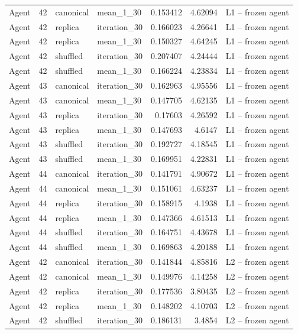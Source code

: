\begin{table}[htbp!]
\begin{tabular}{lrllrrl}
Agent & 42 & canonical & mean\_1\_30 & 0.153412 & 4.62094 & L1 -- frozen agent \\
Agent & 42 & replica & iteration\_30 & 0.166023 & 4.26641 & L1 -- frozen agent \\
Agent & 42 & replica & mean\_1\_30 & 0.150327 & 4.64245 & L1 -- frozen agent \\
Agent & 42 & shuffled & iteration\_30 & 0.207407 & 4.24444 & L1 -- frozen agent \\
Agent & 42 & shuffled & mean\_1\_30 & 0.166224 & 4.23834 & L1 -- frozen agent \\
Agent & 43 & canonical & iteration\_30 & 0.162963 & 4.95556 & L1 -- frozen agent \\
Agent & 43 & canonical & mean\_1\_30 & 0.147705 & 4.62135 & L1 -- frozen agent \\
Agent & 43 & replica & iteration\_30 & 0.17603 & 4.26592 & L1 -- frozen agent \\
Agent & 43 & replica & mean\_1\_30 & 0.147693 & 4.6147 & L1 -- frozen agent \\
Agent & 43 & shuffled & iteration\_30 & 0.192727 & 4.18545 & L1 -- frozen agent \\
Agent & 43 & shuffled & mean\_1\_30 & 0.169951 & 4.22831 & L1 -- frozen agent \\
Agent & 44 & canonical & iteration\_30 & 0.141791 & 4.90672 & L1 -- frozen agent \\
Agent & 44 & canonical & mean\_1\_30 & 0.151061 & 4.63237 & L1 -- frozen agent \\
Agent & 44 & replica & iteration\_30 & 0.158915 & 4.1938 & L1 -- frozen agent \\
Agent & 44 & replica & mean\_1\_30 & 0.147366 & 4.61513 & L1 -- frozen agent \\
Agent & 44 & shuffled & iteration\_30 & 0.164751 & 4.43678 & L1 -- frozen agent \\
Agent & 44 & shuffled & mean\_1\_30 & 0.169863 & 4.20188 & L1 -- frozen agent \\
Agent & 42 & canonical & iteration\_30 & 0.141844 & 4.85816 & L2 -- frozen agent \\
Agent & 42 & canonical & mean\_1\_30 & 0.149976 & 4.14258 & L2 -- frozen agent \\
Agent & 42 & replica & iteration\_30 & 0.177536 & 3.80435 & L2 -- frozen agent \\
Agent & 42 & replica & mean\_1\_30 & 0.148202 & 4.10703 & L2 -- frozen agent \\
Agent & 42 & shuffled & iteration\_30 & 0.186131 & 3.4854 & L2 -- frozen agent \\

\end{tabular}
\end{table}
